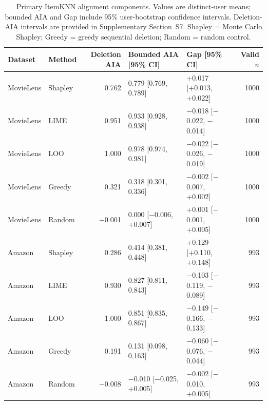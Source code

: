 \begin{table}[t]\centering\small
\setlength{\tabcolsep}{4pt}
\caption{Primary ItemKNN alignment components. Values are distinct-user means; bounded AIA and Gap include 95\% user-bootstrap confidence intervals. Deletion-AIA intervals are provided in Supplementary Section~S7. Shapley = Monte Carlo Shapley; Greedy = greedy sequential deletion; Random = random control.}
\label{tab:aia-components}
\setlength{\tabcolsep}{3.5pt}
\begin{tabular}{@{}llrllr@{}}
\toprule
Dataset & Method & Deletion AIA & Bounded AIA [95\% CI] & Gap [95\% CI] & Valid $n$ \\
\midrule
MovieLens & Shapley & 0.762 & 0.779 [0.769, 0.789] & +0.017 [+0.013, +0.022] & 1000 \\
MovieLens & LIME & 0.951 & 0.933 [0.928, 0.938] & $-$0.018 [$-$0.022, $-$0.014] & 1000 \\
MovieLens & LOO & 1.000 & 0.978 [0.974, 0.981] & $-$0.022 [$-$0.026, $-$0.019] & 1000 \\
MovieLens & Greedy & 0.321 & 0.318 [0.301, 0.336] & $-$0.002 [$-$0.007, +0.002] & 1000 \\
MovieLens & Random & $-$0.001 & 0.000 [$-$0.006, +0.007] & +0.001 [$-$0.001, +0.005] & 1000 \\
\midrule
Amazon & Shapley & 0.286 & 0.414 [0.381, 0.448] & +0.129 [+0.110, +0.148] & 993 \\
Amazon & LIME & 0.930 & 0.827 [0.811, 0.843] & $-$0.103 [$-$0.119, $-$0.089] & 993 \\
Amazon & LOO & 1.000 & 0.851 [0.835, 0.867] & $-$0.149 [$-$0.166, $-$0.133] & 993 \\
Amazon & Greedy & 0.191 & 0.131 [0.098, 0.163] & $-$0.060 [$-$0.076, $-$0.044] & 993 \\
Amazon & Random & $-$0.008 & $-$0.010 [$-$0.025, +0.005] & $-$0.002 [$-$0.010, +0.005] & 993 \\
\bottomrule
\end{tabular}
\end{table}